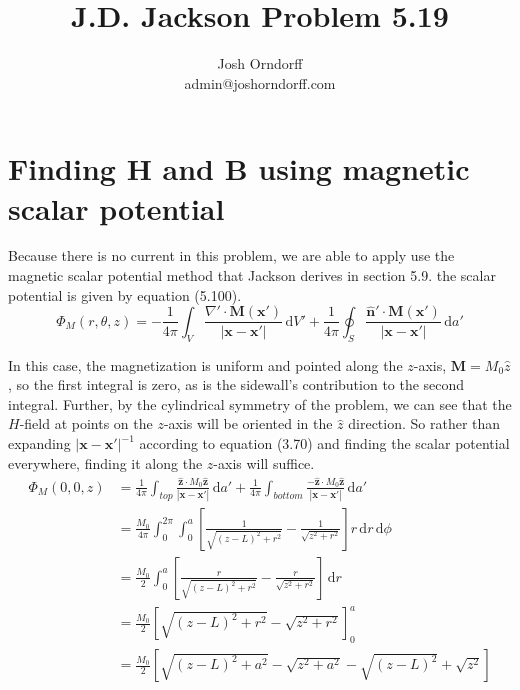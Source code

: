 \documentclass[10pt,a4paper]{article}
\begin{document}
\title{J.D. Jackson Problem 5.19}
\author{Josh Orndorff \\ admin@joshorndorff.com}
\maketitle

\section{Finding \textbf{H} and \textbf{B} using magnetic scalar potential}
Because there is no current in this problem, we are able to apply use the magnetic scalar potential method that Jackson derives in section 5.9.  the scalar potential is given by equation (5.100).
\begin{equation}
\Phi_M(r, \theta, z)=-\frac{1}{4\pi}\int_V\frac{\nabla'\cdot\mathbf{M}(\mathbf{x'})}{|\mathbf{x}-\mathbf{x'}|}\,\mathrm{d}V' + \frac{1}{4\pi}\oint_S\frac{\mathbf{\hat{n}'}\cdot\mathbf{M}(\mathbf{x'})}{|\mathbf{x}-\mathbf{x'}|}\,\mathrm{d}a'
\end{equation}

In this case, the magnetization is uniform and pointed along the $z$-axis, $\mathbf{M}=M_0\hat{z}$, so the first integral is zero, as is the sidewall's contribution to the second integral.  Further, by the cylindrical symmetry of the problem, we can see that the $H$-field at points on the $z$-axis will be oriented in the $\hat{z}$ direction.  So rather than expanding $|\mathbf{x}-\mathbf{x'}|^{-1}$ according to equation (3.70) and finding the scalar potential everywhere, finding it along the $z$-axis will suffice.
\begin{align}
\Phi_M(0, 0, z) &=\frac{1}{4\pi}\int_{top}\frac{\mathbf{\hat{z}}\cdot M_0\mathbf{\hat{z}}}{|\mathbf{x}-\mathbf{x'}|}\,\mathrm{d}a'+\frac{1}{4\pi}\int_{bottom}\frac{-\mathbf{\hat{z}}\cdot M_0\mathbf{\hat{z}}}{|\mathbf{x}-\mathbf{x'}|}\,\mathrm{d}a' \\
&=\frac{M_0}{4\pi}\int_0^{2\pi}\int_0^a\left[\frac{1}{\sqrt{(z-L)^2+r^2}}-\frac{1}{\sqrt{z^2+r^2}}\right]r\,\mathrm{d}r\,\mathrm{d}\phi \\
&=\frac{M_0}{2}\int_0^a\left[\frac{r}{\sqrt{(z-L)^2+r^2}}-\frac{r}{\sqrt{z^2+r^2}}\right]\,\mathrm{d}r \\
&=\frac{M_0}{2}\left[\sqrt{(z-L)^2+r^2}-\sqrt{z^2+r^2}\right]_0^a \\
&=\frac{M_0}{2}\left[\sqrt{(z-L)^2+a^2}-\sqrt{z^2+a^2}-\sqrt{(z-L)^2}+\sqrt{z^2}\right]
\end{align}
\end{document}
